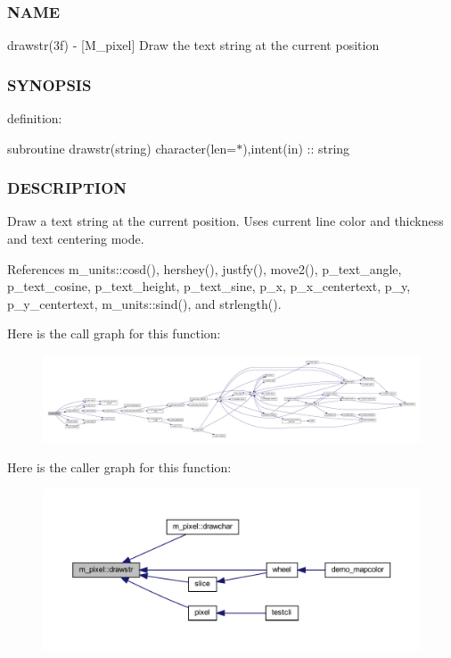 \subsubsection*{N\+A\+ME}

drawstr(3f) -\/ \mbox{[}M\+\_\+pixel\mbox{]} Draw the text string at the current position 

\subsubsection*{S\+Y\+N\+O\+P\+S\+IS}

definition\+:

subroutine drawstr(string) character(len=$\ast$),intent(in) \+:\+: string

\subsubsection*{D\+E\+S\+C\+R\+I\+P\+T\+I\+ON}

Draw a text string at the current position. Uses current line color and thickness and text centering mode. 

References m\+\_\+units\+::cosd(), hershey(), justfy(), move2(), p\+\_\+text\+\_\+angle, p\+\_\+text\+\_\+cosine, p\+\_\+text\+\_\+height, p\+\_\+text\+\_\+sine, p\+\_\+x, p\+\_\+x\+\_\+centertext, p\+\_\+y, p\+\_\+y\+\_\+centertext, m\+\_\+units\+::sind(), and strlength().

Here is the call graph for this function\+:
\nopagebreak
\begin{figure}[H]
\begin{center}
\leavevmode
\includegraphics[width=350pt]{namespacem__pixel_a6fa0c2d531d1ac74840aa2f0e2b050e0_cgraph}
\end{center}
\end{figure}
Here is the caller graph for this function\+:
\nopagebreak
\begin{figure}[H]
\begin{center}
\leavevmode
\includegraphics[width=350pt]{namespacem__pixel_a6fa0c2d531d1ac74840aa2f0e2b050e0_icgraph}
\end{center}
\end{figure}
\mbox{\label{namespacem__pixel_a566adb827a3a26ba42d4e86e4c6e12af}} 

